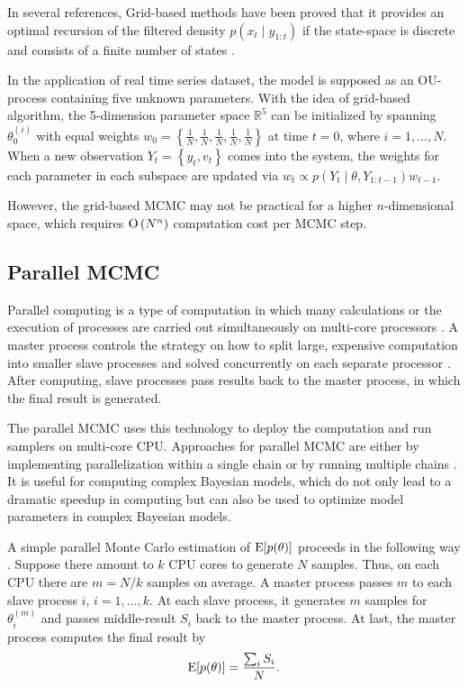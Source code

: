 In several references, Grid-based methods have been proved that it provides an optimal recursion of the filtered density $p(x_t\mid y_{1:t})$ if the state-space is discrete and consists of a finite number of states \citep{ristic2004beyond, stroud2016bayesian, arulampalam2002tutorial, hartmann2016grid}. 

In the application of real time series dataset, the model is supposed as an OU-process containing five unknown parameters. With the idea of grid-based algorithm, the 5-dimension parameter space $\mathbb{R}^5$ can be initialized by spanning $\theta_0^{(i)}$ with equal weights $w_0=\left\lbrace\frac{1}{N},\frac{1}{N},\frac{1}{N},\frac{1}{N},\frac{1}{N}\right\rbrace$ at time $t=0$, where $i=1,\ldots,N$. When a new observation $Y_t=\left\lbrace y_t,v_t\right\rbrace$ comes into the system, the weights for each parameter in each subspace are updated via $w_t\propto p(Y_t\mid \theta,Y_{1:t-1})w_{t-1}$. 

However, the grid-based MCMC may not be practical for a higher $n$-dimensional space, which requires ${\rm O}\left(N^n\right)$ computation cost per MCMC step. 


\subsection*{Parallel MCMC}

Parallel computing is a type of computation in which many calculations or the execution of processes are carried out simultaneously on multi-core processors \citep{asanovic2006landscape}. A master process controls the strategy on how to split large, expensive computation into smaller slave processes and solved concurrently on each separate processor \citep{Almasi1994Highly}. After computing, slave processes pass results back to the master process, in which the final result is generated. 

The parallel MCMC uses this technology to deploy the computation and run samplers on multi-core CPU. Approaches for parallel MCMC are either by implementing parallelization within a single chain or by running multiple chains \citep{wu2012parallel}. It is useful for computing complex Bayesian models, which do not only lead to a dramatic speedup in computing but can also be used to optimize model parameters in complex Bayesian models.

A simple parallel Monte Carlo estimation of $\mathrm{E}\lbrack p(\theta)\rbrack$ proceeds in the following way \citep{kontoghiorghes2005handbook}. Suppose there amount to $k$ CPU cores to generate $N$ samples. Thus, on each CPU there are $m=N/k$ samples on average. A master process passes $m$ to each slave process $i$, $i=1,\ldots,k$. At each slave process, it generates $m$ samples for $\theta_i^{(m)}$ and passes middle-result $S_i$ back to the master process. At last, the master process computes the final result by 
\begin{equation*}
\mathrm{E}\lbrack p(\theta)\rbrack=\frac{\sum_i S_i}{N}. 
\end{equation*}

